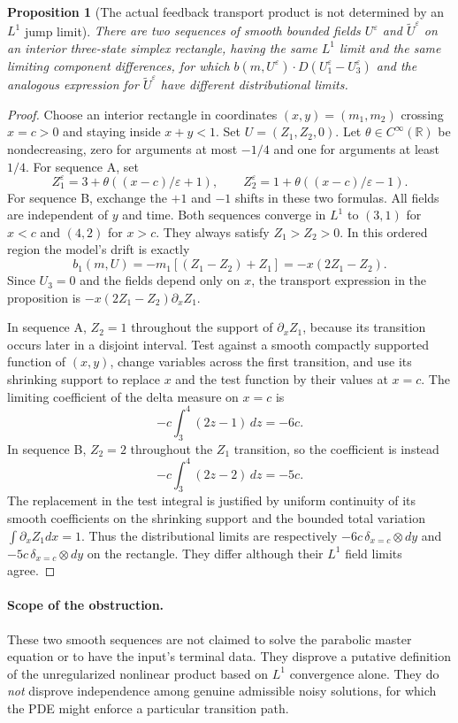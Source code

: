 \documentclass[11pt,a4paper]{article}
\newtheorem{proposition}[theorem]{Proposition}
\theoremstyle{definition}
\theoremstyle{remark}
\begin{document}
\begin{proposition}[The actual feedback transport product is not determined by an $L^1$ jump limit]
There are two sequences of smooth bounded fields $U^\varepsilon$ and $\widetilde U^\varepsilon$ on an interior three-state simplex rectangle, having the same $L^1$ limit and the same limiting component differences, for which
$b(m,U^\varepsilon)\cdot D(U_1^\varepsilon-U_3^\varepsilon)$ and the analogous expression for $\widetilde U^\varepsilon$ have different distributional limits.
\end{proposition}
\begin{proof}
Choose an interior rectangle in coordinates $(x,y)=(m_1,m_2)$ crossing $x=c>0$ and staying inside $x+y<1$. Set $U=(Z_1,Z_2,0)$. Let $\theta\in C^\infty(\mathbb R)$ be nondecreasing, zero for arguments at most $-1/4$ and one for arguments at least $1/4$. For sequence A, set
\[
 Z_1^\varepsilon=3+\theta((x-c)/\varepsilon+1),\qquad
 Z_2^\varepsilon=1+\theta((x-c)/\varepsilon-1).
\]
For sequence B, exchange the $+1$ and $-1$ shifts in these two formulas. All fields are independent of $y$ and time. Both sequences converge in $L^1$ to $(3,1)$ for $x<c$ and $(4,2)$ for $x>c$. They always satisfy $Z_1>Z_2>0$. In this ordered region the model's drift is exactly
\[
 b_1(m,U)=-m_1[(Z_1-Z_2)+Z_1]=-x(2Z_1-Z_2).
\]
Since $U_3=0$ and the fields depend only on $x$, the transport expression in the proposition is $-x(2Z_1-Z_2)\partial_xZ_1$.

In sequence A, $Z_2=1$ throughout the support of $\partial_xZ_1$, because its transition occurs later in a disjoint interval. Test against a smooth compactly supported function of $(x,y)$, change variables across the first transition, and use its shrinking support to replace $x$ and the test function by their values at $x=c$. The limiting coefficient of the delta measure on $x=c$ is
\[
 -c\int_3^4(2z-1)\,dz=-6c.
\]
In sequence B, $Z_2=2$ throughout the $Z_1$ transition, so the coefficient is instead
\[
 -c\int_3^4(2z-2)\,dz=-5c.
\]
The replacement in the test integral is justified by uniform continuity of its smooth coefficients on the shrinking support and the bounded total variation $\int\partial_xZ_1dx=1$. Thus the distributional limits are respectively $-6c\,\delta_{x=c}\otimes dy$ and $-5c\,\delta_{x=c}\otimes dy$ on the rectangle. They differ although their $L^1$ field limits agree.
\end{proof}

\paragraph{Scope of the obstruction.}
These two smooth sequences are not claimed to solve the parabolic master equation or to have the input's terminal data. They disprove a putative definition of the unregularized nonlinear product based on $L^1$ convergence alone. They do \emph{not} disprove independence among genuine admissible noisy solutions, for which the PDE might enforce a particular transition path.
\end{document}
